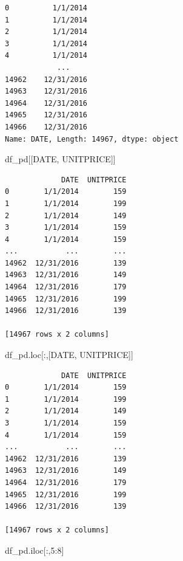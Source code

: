\documentclass[
  letterpaper,
  DIV=11,
  numbers=noendperiod]{scrreprt}
\newenvironment{Shaded}{\begin{snugshade}}{\end{snugshade}}
\newcommand{\DecValTok}[1]{\textcolor[rgb]{0.68,0.00,0.00}{#1}}
\newcommand{\NormalTok}[1]{\textcolor[rgb]{0.00,0.23,0.31}{#1}}
\newcommand{\StringTok}[1]{\textcolor[rgb]{0.13,0.47,0.30}{#1}}
\begin{document}
\begin{verbatim}
0          1/1/2014
1          1/1/2014
2          1/1/2014
3          1/1/2014
4          1/1/2014
            ...    
14962    12/31/2016
14963    12/31/2016
14964    12/31/2016
14965    12/31/2016
14966    12/31/2016
Name: DATE, Length: 14967, dtype: object
\end{verbatim}

\begin{Shaded}
\begin{Highlighting}[]
\NormalTok{df\_pd[[}\StringTok{\textquotesingle{}DATE\textquotesingle{}}\NormalTok{, }\StringTok{\textquotesingle{}UNITPRICE\textquotesingle{}}\NormalTok{]]   }
\end{Highlighting}
\end{Shaded}

\begin{verbatim}
             DATE  UNITPRICE
0        1/1/2014        159
1        1/1/2014        199
2        1/1/2014        149
3        1/1/2014        159
4        1/1/2014        159
...           ...        ...
14962  12/31/2016        139
14963  12/31/2016        149
14964  12/31/2016        179
14965  12/31/2016        199
14966  12/31/2016        139

[14967 rows x 2 columns]
\end{verbatim}

\begin{Shaded}
\begin{Highlighting}[]
\NormalTok{df\_pd.loc[:,[}\StringTok{\textquotesingle{}DATE\textquotesingle{}}\NormalTok{, }\StringTok{\textquotesingle{}UNITPRICE\textquotesingle{}}\NormalTok{]]   }
\end{Highlighting}
\end{Shaded}

\begin{verbatim}
             DATE  UNITPRICE
0        1/1/2014        159
1        1/1/2014        199
2        1/1/2014        149
3        1/1/2014        159
4        1/1/2014        159
...           ...        ...
14962  12/31/2016        139
14963  12/31/2016        149
14964  12/31/2016        179
14965  12/31/2016        199
14966  12/31/2016        139

[14967 rows x 2 columns]
\end{verbatim}

\begin{Shaded}
\begin{Highlighting}[]
\NormalTok{df\_pd.iloc[:,}\DecValTok{5}\NormalTok{:}\DecValTok{8}\NormalTok{]}
\end{Highlighting}
\end{Shaded}
\end{document}
